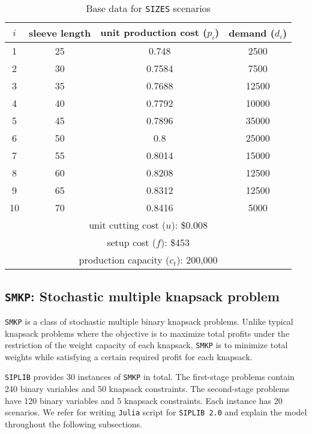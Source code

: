 \begin{table}[]
	\centering
	\caption{Base data for \texttt{SIZES} scenarios \cite{journal:JSW1999}}
	\label{sizes:data}
	\begin{tabular}{cccc}
		\hline
		$i$  & sleeve length & unit production cost ($p_i$) & demand ($d_i$) \\ \hline
		1  & 25            & 0.748                & 2500   \\
		2  & 30            & 0.7584               & 7500   \\
		3  & 35            & 0.7688               & 12500  \\
		4  & 40            & 0.7792               & 10000  \\
		5  & 45            & 0.7896               & 35000  \\
		6  & 50            & 0.8                  & 25000  \\
		7  & 55            & 0.8014               & 15000  \\
		8  & 60            & 0.8208               & 12500  \\
		9  & 65            & 0.8312               & 12500  \\
		10 & 70            & 0.8416               & 5000   \\ \hline
		\multicolumn{4}{c}{unit cutting cost ($u$): \$0.008}     \\
		\multicolumn{4}{c}{setup cost ($f$): \$453}              \\ 
		\multicolumn{4}{c}{production capacity ($c_t$): 200,000} \\ \hline
	\end{tabular}
\end{table}


\subsection{\texttt{SMKP}: Stochastic multiple knapsack problem} \label{SMKP}
\texttt{SMKP} is a class of stochastic multiple binary knapsack problems. Unlike typical knapsack problems where the objective is to maximize total profits under the restriction of the weight capacity of each knapsack, \texttt{SMKP} is to minimize total weights while satisfying a certain required profit for each knapsack. 

\texttt{SIPLIB} provides 30 instances of \texttt{SMKP} in total. The first-stage problems contain 240 binary variables and 50 knapsack constraints. The second-stage problems have 120 binary variables and 5 knapsack constraints. Each instance has 20 scenarios. 
We refer \cite{journal:AAD2014} for writing \texttt{Julia} script for \texttt{SIPLIB 2.0} and explain the model throughout the following subsections.
